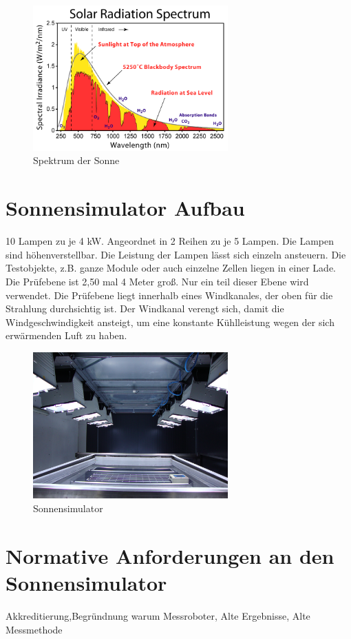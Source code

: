 \documentclass[a4paper,bibtotoc,oneside]{scrbook}
\begin{document}
\begin{figure}[htbp]
\centering
\includegraphics[width=75mm]{img/Solar_Spectrum.png}
\caption{Spektrum der Sonne}\label{sunspec}
\end{figure}


\section{Sonnensimulator Aufbau}\thispagestyle{empty}
10 Lampen zu je 4 kW. Angeordnet in 2 Reihen zu je 5 Lampen. Die Lampen sind höhenverstellbar.
Die Leistung der Lampen lässt sich einzeln ansteuern.
Die Testobjekte, z.B. ganze Module oder auch einzelne Zellen liegen in einer Lade.
Die Prüfebene ist 2,50 mal 4 Meter groß. Nur ein teil dieser Ebene wird verwendet.
Die Prüfebene liegt innerhalb eines Windkanales, der oben für die Strahlung durchsichtig ist.
Der Windkanal verengt sich, damit die Windgeschwindigkeit ansteigt, um eine konstante Kühlleistung wegen der sich erwärmenden Luft zu haben. 

\begin{figure}[htbp]
\centering
\includegraphics[width=75mm]{img/sunsimulator.jpg}
\caption[Sonnensimulator]{Sonnensimulator}\label{sunsim}
\end{figure}


\section{Normative Anforderungen an den Sonnensimulator}\thispagestyle{empty}
Akkreditierung,Begründnung warum Messroboter, Alte Ergebnisse, Alte Messmethode
\end{document}
